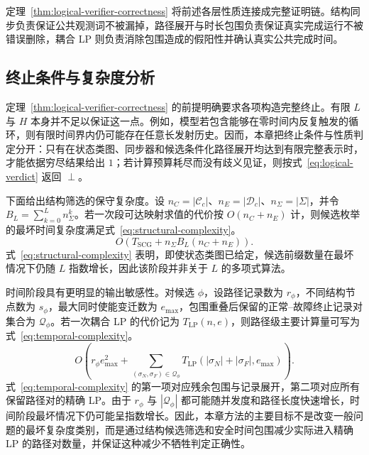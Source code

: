 \documentclass[master,fontset=ubuntu]{shnuthesis}
\DeclareRobustCommand{\logicstatus}[1]{\ensuremath{#1}}
\theoremstyle{definition}
\begin{document}
定理~\ref{thm:logical-verifier-correctness} 将前述各层性质连接成完整证明链。结构同步负责保证公共观测词不被漏掉，路径展开与时长包围负责保证真实完成运行不被错误删除，耦合 LP 则负责消除包围造成的假阳性并确认真实公共完成时间。

\subsection{终止条件与复杂度分析}

定理~\ref{thm:logical-verifier-correctness} 的前提明确要求各项构造完整终止。有限 \(L\) 与 \(H\) 本身并不足以保证这一点。例如，模型若包含能够在零时间内反复触发的循环，则有限时间界内仍可能存在任意长发射历史。因而，本章把终止条件与性质判定分开：只有在状态类图、同步器和候选条件化路径展开均达到有限完整表示时，才能依据穷尽结果给出 \logicstatus{1}；若计算预算耗尽而没有歧义见证，则按式~\eqref{eq:logical-verdict} 返回 \logicstatus{\perp}。

下面给出结构筛选的保守复杂度。设 \(n_C=|\mathcal C_c|\)、\(n_E=|\mathcal D_c|\)、\(n_\Sigma=|\Sigma|\)，并令 \(B_L=\sum_{k=0}^{L}n_\Sigma^k\)。若一次段可达映射求值的代价按 \(O(n_C+n_E)\) 计，则候选枚举的最坏时间复杂度满足式~\eqref{eq:structural-complexity}。
\begin{equation}
O\!\left(
T_{\mathrm{SCG}}
+
n_\Sigma B_L(n_C+n_E)
\right).
\label{eq:structural-complexity}
\end{equation}
式~\eqref{eq:structural-complexity} 表明，即使状态类图已给定，候选前缀数量在最坏情况下仍随 \(L\) 指数增长，因此该阶段并非关于 \(L\) 的多项式算法。

时间阶段具有更明显的输出敏感性。对候选 \(\phi\)，设路径记录数为 \(r_\phi\)，不同结构节点数为 \(s_\phi\)，最大同时使能变迁数为 \(e_{\max}\)，包围重叠后保留的正常--故障终止记录对集合为 \(\mathcal Q_\phi\)。若一次耦合 LP 的代价记为 \(T_{\mathrm{LP}}(n,e)\)，则路径级主要计算量可写为式~\eqref{eq:temporal-complexity}。
\begin{equation}
O\!\left(
r_\phi e_{\max}^{2}
+
\sum_{(\sigma_N,\sigma_F)\in\mathcal Q_\phi}
T_{\mathrm{LP}}
\!\left(
|\sigma_N|+|\sigma_F|,
e_{\max}
\right)
\right).
\label{eq:temporal-complexity}
\end{equation}
式~\eqref{eq:temporal-complexity} 的第一项对应残余包围与记录展开，第二项对应所有保留路径对的精确 LP。由于 \(r_\phi\) 与 \(|\mathcal Q_\phi|\) 都可能随并发度和路径长度快速增长，时间阶段最坏情况下仍可能呈指数增长。因此，本章方法的主要目标不是改变一般问题的最坏复杂度类别，而是通过结构候选筛选和安全时间包围减少实际进入精确 LP 的路径对数量，并保证这种减少不牺牲判定正确性。
\end{document}
